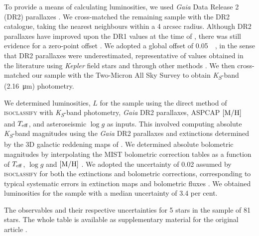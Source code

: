 To provide a means of calculating luminosities, we used \emph{Gaia} Data Release 2 (DR2) parallaxes \citep{GaiaCollaboration.Prusti.ea2016, GaiaCollaboration.Brown.ea2018}. We cross-matched the remaining sample with the DR2 catalogue, taking the nearest neighbours within a 4 arcsec radius. Although DR2 parallaxes have improved upon the DR1 values at the time of , there was still evidence for a zero-point offset \citep{Lindegren.Hernandez.ea2018}. We adopted a global offset of \SI{0.05}{\milli\aarcsec}, in the sense that DR2 parallaxes were underestimated, representative of values obtained in the literature using \textit{Kepler} field stars \citep[see e.g.][]{Zinn.Pinsonneault.ea2019, Hall.Davies.ea2019} and through other methods \citep[see e.g.][]{Riess.Casertano.ea2018, Chan.Bovy2020}. We then cross-matched our sample with the Two-Micron All Sky Survey \citep[2MASS;][]{Skrutskie.Cutri.ea2006} to obtain \emph{K\textsubscript{S}}-band (\SI{2.16}{\micro\metre}) photometry.

We determined luminosities, $L$ for the sample using the direct method of \textsc{isoclassify} \citep{Huber.Zinn.ea2017, Berger.Huber.ea2020} with \emph{K\textsubscript{S}}-band photometry, \emph{Gaia} DR2 parallaxes, ASPCAP $[\mathrm{M}/\mathrm{H}]$ and ${T_\mathrm{eff}}$, and asteroseismic $\log g$ as inputs. This involved computing absolute \emph{K\textsubscript{S}}-band magnitudes using the \emph{Gaia} DR2 parallaxes and extinctions determined by the 3D galactic reddening maps of \citet{Green.Schlafly.ea2018}. We determined absolute bolometric magnitudes by interpolating the MIST bolometric correction tables as a function of ${T_\mathrm{eff}}$, $\log g$ and $[\mathrm{M}/\mathrm{H}]$ \citep{Dotter2016, Choi.Dotter.ea2016}. We adopted the uncertainty of \SI{0.02}{\magnitude} assumed by \textsc{isoclassify} for both the extinctions and bolometric corrections, corresponding to typical systematic errors in extinction maps and bolometric fluxes \citep[e.g.][]{Zinn.Pinsonneault.ea2019a,Tayar.Claytor.ea2020}. We obtained luminosities for the sample with a median uncertainty of 3.4 per cent.

\begin{table}
	\centering
	\caption[The observables and their respective uncertainties for 5 stars in the sample of 81 stars.]{The observables and their respective uncertainties for 5 stars in the sample of 81 stars. The whole table is available as supplementary material for the original article \citep{Lyttle.Davies.ea2021}.}
	\label{tab:data}
	
\end{table}

